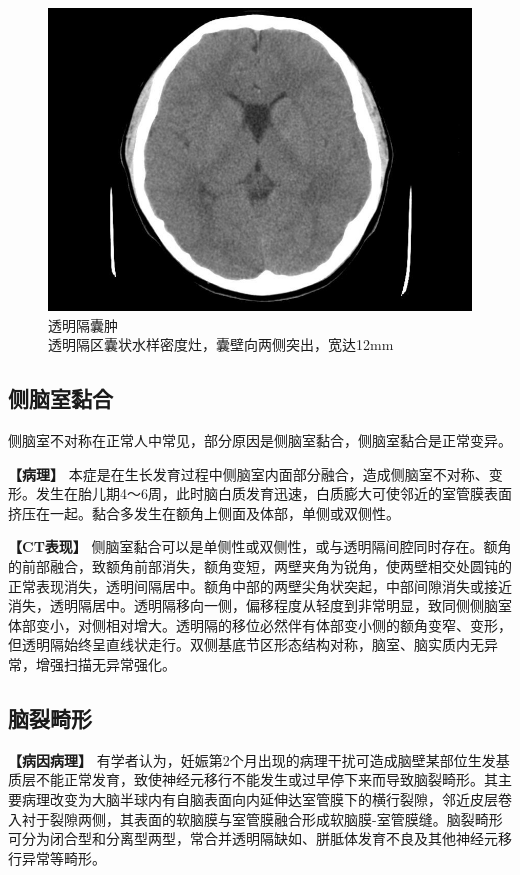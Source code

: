 \begin{figure}[!htbp]
 \centering
 \includegraphics[width=.7\textwidth,height=\textheight,keepaspectratio]{./images/Image00023.jpg}
 \captionsetup{justification=centering}
 \caption{透明隔囊肿\\{\small 透明隔区囊状水样密度灶，囊壁向两侧突出，宽达12mm}}
 \label{fig2-7}
  \end{figure} 



\subsection{侧脑室黏合}

侧脑室不对称在正常人中常见，部分原因是侧脑室黏合，侧脑室黏合是正常变异。

\textbf{【病理】}
本症是在生长发育过程中侧脑室内面部分融合，造成侧脑室不对称、变形。发生在胎儿期4～6周，此时脑白质发育迅速，白质膨大可使邻近的室管膜表面挤压在一起。黏合多发生在额角上侧面及体部，单侧或双侧性。

\textbf{【CT表现】}
侧脑室黏合可以是单侧性或双侧性，或与透明隔间腔同时存在。额角的前部融合，致额角前部消失，额角变短，两壁夹角为锐角，使两壁相交处圆钝的正常表现消失，透明间隔居中。额角中部的两壁尖角状突起，中部间隙消失或接近消失，透明隔居中。透明隔移向一侧，偏移程度从轻度到非常明显，致同侧侧脑室体部变小，对侧相对增大。透明隔的移位必然伴有体部变小侧的额角变窄、变形，但透明隔始终呈直线状走行。双侧基底节区形态结构对称，脑室、脑实质内无异常，增强扫描无异常强化。

\subsection{脑裂畸形}

\textbf{【病因病理】}
有学者认为，妊娠第2个月出现的病理干扰可造成脑壁某部位生发基质层不能正常发育，致使神经元移行不能发生或过早停下来而导致脑裂畸形。其主要病理改变为大脑半球内有自脑表面向内延伸达室管膜下的横行裂隙，邻近皮层卷入衬于裂隙两侧，其表面的软脑膜与室管膜融合形成软脑膜-室管膜缝。脑裂畸形可分为闭合型和分离型两型，常合并透明隔缺如、胼胝体发育不良及其他神经元移行异常等畸形。

